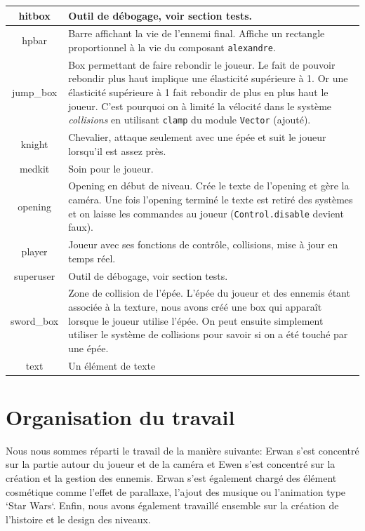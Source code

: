 \documentclass{article}
\begin{document}
\begin{center}
\begin{tabular}[h]{ |c|p{10cm}| }
        \hline
        hitbox & Outil de débogage, voir section tests. \\
        \hline
        hpbar & Barre affichant la vie de l'ennemi final. Affiche un rectangle proportionnel à la vie du composant \verb|alexandre|. \\
        \hline
        jump\_box & Box permettant de faire rebondir le joueur. Le fait de pouvoir rebondir plus haut implique une élasticité 
        supérieure à 1. Or une élasticité supérieure à 1 fait rebondir de plus en plus haut le joueur. C'est pourquoi on à limité la 
        vélocité dans le système \textit{collisions} en utilisant \verb|clamp| du module \verb|Vector| (ajouté). \\
        \hline
        knight & Chevalier, attaque seulement avec une épée et suit le joueur lorsqu'il est assez près. \\
        \hline
        medkit & Soin pour le joueur. \\
        \hline
        opening & Opening en début de niveau. Crée le texte de l'opening et gère la caméra. Une fois l'opening terminé 
        le texte est retiré des systèmes et on laisse les commandes au joueur (\verb|Control.disable| devient faux). \\
        \hline
        player & Joueur avec ses fonctions de contrôle, collisions, mise à jour en temps réel. \\
        \hline
        superuser & Outil de débogage, voir section tests. \\
        \hline
        sword\_box & Zone de collision de l'épée. L'épée du joueur et des ennemis étant associée à la texture, nous avons 
        créé une box qui apparaît lorsque le joueur utilise l'épée. On peut ensuite simplement utiliser le système de collisions 
        pour savoir si on a été touché par une épée. \\
        \hline
        text & Un élément de texte \\
        \hline

    \end{tabular}
\end{center}



\section{Organisation du travail}

Nous nous sommes réparti le travail de la manière suivante:
Erwan s'est concentré sur la partie autour du joueur et de la caméra et Ewen s'est concentré sur la création et
la gestion des ennemis.
Erwan s'est également chargé des élément cosmétique comme l'effet de parallaxe, l'ajout des musique ou 
l'animation type `Star Wars`.
Enfin, nous avons également travaillé ensemble sur la création de l'histoire et le design des niveaux.
\end{document}
